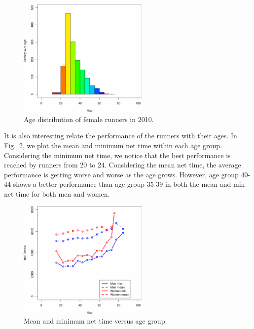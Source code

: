 \documentclass[twocolumn]{article}
\begin{document}
\begin{figure}[h]
    \centering
    \includegraphics[width=2.5in]{figs/group_f2010.pdf}
    \caption{Age distribution of female runners in 2010.}
    \label{fig:age_female}
\end{figure}

It is also interesting relate the performance of the runners with their ages. In
Fig.~\ref{fig:time_group_age}, we plot the mean and minimum net time within each
age group. Considering the minimum net time, we notice that the best
performance is reached by runners from 20 to 24. Considering the mean net time,
the average performance is getting worse and worse as the age grows. However,
age group 40-44 shows a better performance than age group 35-39 in both the mean
and min net time for both men and women.

\begin{figure}[!h]
    \centering
    \includegraphics[width=2.5in]{figs/time_net_group_2010.pdf}
    \caption{Mean and minimum net time versus age group.}
    \label{fig:time_group_age}
\end{figure}
\end{document}

